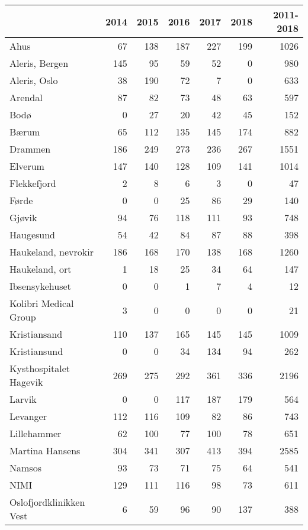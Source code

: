 \documentclass [norsk,a4paper,twoside]{article}\usepackage[]{graphicx}\usepackage[]{color}
\begin{document}
\begin{table}[ht]
\centering
\begin{tabular}{lrrrrrr}
  \hline
 & 2014 & 2015 & 2016 & 2017 & 2018 & 2011-2018 \\ 
  \hline
Ahus & 67 & 138 & 187 & 227 & 199 & 1026 \\ 
  Aleris, Bergen & 145 & 95 & 59 & 52 & 0 & 980 \\ 
  Aleris, Oslo & 38 & 190 & 72 & 7 & 0 & 633 \\ 
  Arendal & 87 & 82 & 73 & 48 & 63 & 597 \\ 
  Bodø & 0 & 27 & 20 & 42 & 45 & 152 \\ 
  Bærum & 65 & 112 & 135 & 145 & 174 & 882 \\ 
  Drammen & 186 & 249 & 273 & 236 & 267 & 1551 \\ 
  Elverum & 147 & 140 & 128 & 109 & 141 & 1014 \\ 
  Flekkefjord & 2 & 8 & 6 & 3 & 0 & 47 \\ 
  Førde & 0 & 0 & 25 & 86 & 29 & 140 \\ 
  Gjøvik & 94 & 76 & 118 & 111 & 93 & 748 \\ 
  Haugesund & 54 & 42 & 84 & 87 & 88 & 398 \\ 
  Haukeland, nevrokir & 186 & 168 & 170 & 138 & 168 & 1260 \\ 
  Haukeland, ort & 1 & 18 & 25 & 34 & 64 & 147 \\ 
  Ibsensykehuset & 0 & 0 & 1 & 7 & 4 & 12 \\ 
  Kolibri Medical Group & 3 & 0 & 0 & 0 & 0 & 21 \\ 
  Kristiansand & 110 & 137 & 165 & 145 & 145 & 1009 \\ 
  Kristiansund & 0 & 0 & 34 & 134 & 94 & 262 \\ 
  Kysthospitalet Hagevik & 269 & 275 & 292 & 361 & 336 & 2196 \\ 
  Larvik & 0 & 0 & 117 & 187 & 179 & 564 \\ 
  Levanger & 112 & 116 & 109 & 82 & 86 & 743 \\ 
  Lillehammer & 62 & 100 & 77 & 100 & 78 & 651 \\ 
  Martina Hansens & 304 & 341 & 307 & 413 & 394 & 2585 \\ 
  Namsos & 93 & 73 & 71 & 75 & 64 & 541 \\ 
  NIMI & 129 & 111 & 116 & 98 & 73 & 611 \\ 
  Oslofjordklinikken Vest & 6 & 59 & 96 & 90 & 137 & 388 \\ 

\end{tabular}
\end{table}
\end{document}
